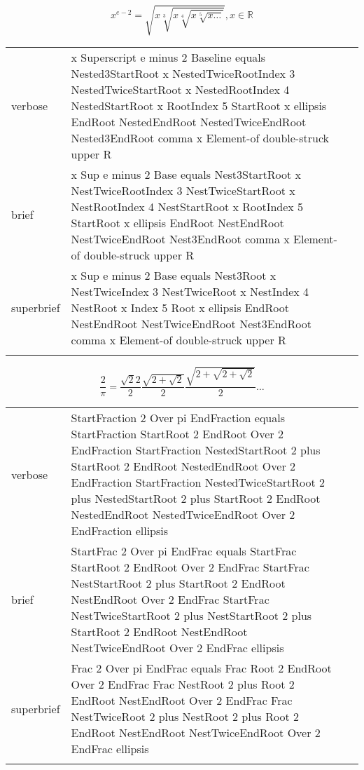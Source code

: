 \E \[x^{e-2}=\sqrt{x\sqrt[3]{x\sqrt[4]{x\sqrt[5]{x\ldots}}}}, x\in\mathbb{R}\]
\begin{longtable}[c]{@{}lll@{}}
\toprule\addlinespace
verbose & x Superscript e minus 2 Baseline equals Nested3StartRoot x
NestedTwiceRootIndex 3 NestedTwiceStartRoot x NestedRootIndex 4
NestedStartRoot x RootIndex 5 StartRoot x ellipsis EndRoot NestedEndRoot
NestedTwiceEndRoot Nested3EndRoot comma x Element-of double-struck upper
R &

\\\addlinespace
brief & x Sup e minus 2 Base equals Nest3StartRoot x NestTwiceRootIndex
3 NestTwiceStartRoot x NestRootIndex 4 NestStartRoot x RootIndex 5
StartRoot x ellipsis EndRoot NestEndRoot NestTwiceEndRoot Nest3EndRoot
comma x Element-of double-struck upper R &

\\\addlinespace
superbrief & x Sup e minus 2 Base equals Nest3Root x NestTwiceIndex 3
NestTwiceRoot x NestIndex 4 NestRoot x Index 5 Root x ellipsis EndRoot
NestEndRoot NestTwiceEndRoot Nest3EndRoot comma x Element-of
double-struck upper R &

\\\addlinespace
\bottomrule
\end{longtable}


\E \[\frac{2}{\pi}=\frac{\sqrt{2}{2}}{2}\frac{\sqrt{2+\sqrt{2}}}{2}\frac{\sqrt{2+\sqrt{2+\sqrt{2}}}}{2}\ldots\]
\begin{longtable}[c]{@{}lll@{}}
\toprule\addlinespace
verbose & StartFraction 2 Over pi EndFraction equals StartFraction
StartRoot 2 EndRoot Over 2 EndFraction StartFraction NestedStartRoot 2
plus StartRoot 2 EndRoot NestedEndRoot Over 2 EndFraction StartFraction
NestedTwiceStartRoot 2 plus NestedStartRoot 2 plus StartRoot 2 EndRoot
NestedEndRoot NestedTwiceEndRoot Over 2 EndFraction ellipsis &

\\\addlinespace
brief & StartFrac 2 Over pi EndFrac equals StartFrac StartRoot 2 EndRoot
Over 2 EndFrac StartFrac NestStartRoot 2 plus StartRoot 2 EndRoot
NestEndRoot Over 2 EndFrac StartFrac NestTwiceStartRoot 2 plus
NestStartRoot 2 plus StartRoot 2 EndRoot NestEndRoot NestTwiceEndRoot
Over 2 EndFrac ellipsis &

\\\addlinespace
superbrief & Frac 2 Over pi EndFrac equals Frac Root 2 EndRoot Over 2
EndFrac Frac NestRoot 2 plus Root 2 EndRoot NestEndRoot Over 2 EndFrac
Frac NestTwiceRoot 2 plus NestRoot 2 plus Root 2 EndRoot NestEndRoot
NestTwiceEndRoot Over 2 EndFrac ellipsis &

\\\addlinespace
\bottomrule
\end{longtable}




